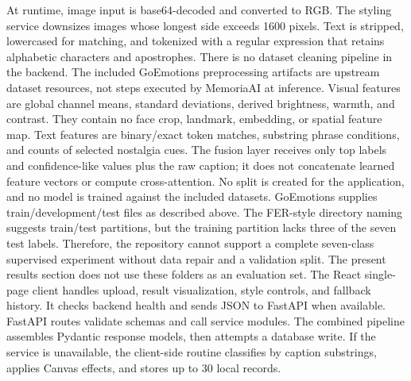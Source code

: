 \documentclass[conference]{IEEEtran}
\begin{document}
{}
\markdownRendererSectionEnd \markdownRendererSectionBegin
{}\markdownRendererInterblockSeparator
{}At runtime, image input is base64-decoded and converted to RGB. The styling service downsizes images whose longest side exceeds 1600 pixels. Text is stripped, lowercased for matching, and tokenized with a regular expression that retains alphabetic characters and apostrophes. There is no dataset cleaning pipeline in the backend. The included GoEmotions preprocessing artifacts are upstream dataset resources, not steps executed by MemoriaAI at inference.\markdownRendererInterblockSeparator
{}
\markdownRendererSectionEnd \markdownRendererSectionBegin
{}\markdownRendererInterblockSeparator
{}Visual features are global channel means, standard deviations, derived brightness, warmth, and contrast. They contain no face crop, landmark, embedding, or spatial feature map. Text features are binary/exact token matches, substring phrase conditions, and counts of selected nostalgia cues. The fusion layer receives only top labels and confidence-like values plus the raw caption; it does not concatenate learned feature vectors or compute cross-attention.\markdownRendererInterblockSeparator
{}
\markdownRendererSectionEnd \markdownRendererSectionBegin
{}\markdownRendererInterblockSeparator
{}No split is created for the application, and no model is trained against the included datasets. GoEmotions supplies train/development/test files as described above. The FER-style directory naming suggests train/test partitions, but the training partition lacks three of the seven test labels. Therefore, the repository cannot support a complete seven-class supervised experiment without data repair and a validation split. The present results section does not use these folders as an evaluation set.\markdownRendererInterblockSeparator
{}
\markdownRendererSectionEnd 
\markdownRendererSectionEnd \markdownRendererSectionBegin
{}\markdownRendererInterblockSeparator
{}\markdownRendererSectionBegin
{}\markdownRendererInterblockSeparator
{}The React single-page client handles upload, result visualization, style controls, and fallback history. It checks backend health and sends JSON to FastAPI when available. FastAPI routes validate schemas and call service modules. The combined pipeline assembles Pydantic response models, then attempts a database write. If the service is unavailable, the client-side routine classifies by caption substrings, applies Canvas effects, and stores up to 30 local records.\markdownRendererParagraphSeparator
\end{document}
